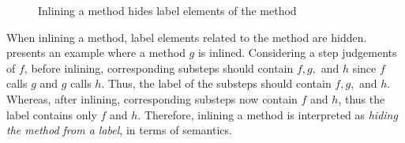 \begin{figure}[t]
  \begin{subfigure}[b]{0.5\textwidth}
  \end{subfigure}
  \begin{subfigure}[b]{0.5\textwidth}
  \end{subfigure}
  \caption{Inlining a method hides label elements of the method}
  \label{ex-inlining-hide}
\end{figure}

When inlining a method, label elements related to the method are
hidden.  presents an example where a method
$g$ is inlined. Considering a step judgements of $f$, before inlining,
corresponding substeps should contain $f, g,$ and $h$ since $f$ calls
$g$ and $g$ calls $h$. Thus, the label of the substeps should contain
$f, g,$ and $h$. Whereas, after inlining, corresponding substeps now
contain $f$ and $h$, thus the label contains only $f$ and
$h$. Therefore, inlining a method is interpreted as \emph{hiding the
  method from a label}, in terms of semantics.

